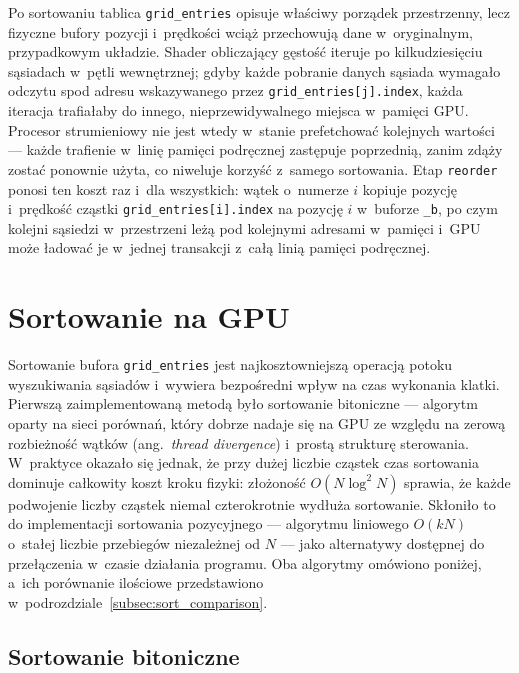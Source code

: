 Po sortowaniu tablica \texttt{grid\_entries} opisuje właściwy porządek
przestrzenny, lecz fizyczne bufory pozycji i~prędkości wciąż przechowują
dane w~oryginalnym, przypadkowym układzie.
Shader obliczający gęstość iteruje po kilkudziesięciu sąsiadach w~pętli
wewnętrznej; gdyby każde pobranie danych sąsiada wymagało odczytu spod
adresu wskazywanego przez \texttt{grid\_entries[j].index}, każda iteracja
trafiałaby do innego, nieprzewidywalnego miejsca w~pamięci GPU.
Procesor strumieniowy nie jest wtedy w~stanie prefetchować kolejnych wartości
--- każde trafienie w~linię pamięci podręcznej zastępuje poprzednią, zanim
zdąży zostać ponownie użyta, co niweluje korzyść z~samego sortowania.
Etap \texttt{reorder} ponosi ten koszt raz i~dla wszystkich: wątek o~numerze
$i$ kopiuje pozycję i~prędkość cząstki \texttt{grid\_entries[i].index}
na pozycję $i$ w~buforze \texttt{\_b}, po czym kolejni sąsiedzi w~przestrzeni
leżą pod kolejnymi adresami w~pamięci i~GPU może ładować je w~jednej
transakcji z~całą linią pamięci podręcznej.

\section{Sortowanie na GPU}
\label{sec:sorting}

Sortowanie bufora \texttt{grid\_entries} jest najkosztowniejszą operacją
potoku wyszukiwania sąsiadów i~wywiera bezpośredni wpływ na czas wykonania klatki.
Pierwszą zaimplementowaną metodą było sortowanie bitoniczne --- algorytm oparty na
sieci porównań, który dobrze nadaje się na GPU ze względu na zerową
rozbieżność wątków (ang.~\textit{thread divergence}) i~prostą strukturę sterowania.
W~praktyce okazało się jednak, że przy dużej liczbie cząstek czas
sortowania dominuje całkowity koszt kroku fizyki: złożoność $O(N \log^2 N)$
sprawia, że każde podwojenie liczby cząstek niemal czterokrotnie wydłuża
sortowanie.
Skłoniło to do implementacji sortowania pozycyjnego --- algorytmu liniowego
$O(kN)$ o~stałej liczbie przebiegów niezależnej od $N$ --- jako
alternatywy dostępnej do przełączenia w~czasie działania programu.
Oba algorytmy omówiono poniżej, a~ich porównanie ilościowe przedstawiono
w~podrozdziale~\ref{subsec:sort_comparison}.

\subsection{Sortowanie bitoniczne}
\label{subsec:bitonic}

